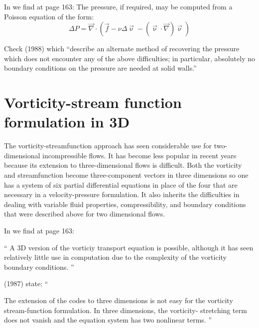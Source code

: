 \vspace{1cm}

In \textcite{reddybook2} we find at page 163:  The pressure, if required, may be computed from a Poisson equation of the form:
\[
\Delta P = \vec\nabla \cdot(\vec{f} - \nu \Delta \vec\upnu - (\vec\upnu\cdot\vec\nabla) \vec\upnu)
\]



Check \textcite{gupe88} (1988) which ``describe an alternate method of recovering the 
pressure which does not encounter any of the above difficulties; in particular, absolutely 
no boundary conditions on the pressure are needed at solid walls.''





\section{Vorticity-stream function formulation in 3D}

The vorticity-streamfunction approach has seen considerable use for two-dimensional 
incompressible flows. It has become less popular in recent years because its extension 
to three-dimensional flows is difficult.
Both the vorticity and streamfunction become three-component vectors in three dimensions
so one has a system of six partial differential equations in place of the four that are 
necessary in a velocity-pressure formulation. It also inherits the difficulties in dealing 
with variable fluid properties, compressibility, and boundary conditions that were 
described above for two dimensional flows.

In \textcite{reddybook2} we find at page 163: 
\begin{displayquote}
{\color{darkgray}
``
A 3D version of the  vorticiy transport equation is possible, 
although it has seen relatively little use in computation due to the complexity 
of the vorticity boundary conditions.
'' }
\end{displayquote}

\noindent \textcite{glte87} (1987) state: ``
\begin{displayquote}
{\color{darkgray}
The extension of the codes to three dimensions is not easy
for the vorticity stream-function formulation. In three dimensions, the vorticity-
stretching term does not vanish and the equation system has two nonlinear terms.
''}
\end{displayquote}



